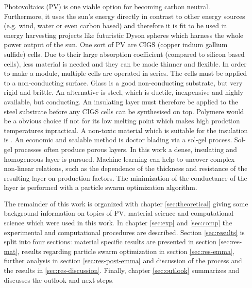Photovoltaics (PV) is one viable option for becoming carbon neutral. 
Furthermore, 
it uses the sun's energy directly in contrast to other energy sources (e.g. wind, water or even carbon based) and therefore 
it is fit to be used in energy harvesting projects like futuristic Dyson spheres\cite{dyson1960search} which harness the whole power output of the sun.
%
One sort of PV are CIGS (copper indium gallium sulfide) cells\cite{Vasekar2010}. 
Due to their large absorption coefficient (compared to silicon based cells), less material is needed and they can be made thinner and flexible. 
In order to make a module, multiple cells are operated in series. 
The cells must be applied to a non-conducting surface.
Glass is a good non-conducting substrate, but very rigid and brittle. 
An alternative is steel, which is ductile, inexpensive and highly available, but conducting. 
An insulating layer must therefore be applied to the steel substrate before any CIGS cells can be synthesised on top.
Polymere would be a obvious choice if not for its low melting point which makes high prodction temperatures inpractical.
A non-toxic material which is suitable for the insulation is . 
An economic and scalable method is doctor blading via a sol-gel process. 
Sol-gel processes often produce porous layers. 
In this work a dense, insulating and homogeneous layer is pursued. 
Machine learning can help to uncover complex non-linear relations, such as the 
dependence of the thickness and resistance of the resulting layer on production factors.
The minimization of the conductance of the layer is performed with a particle swarm optimization 
algorithm. 


The remainder of this work is organized with chapter 
\ref{sec:theoretical} giving 
some background information on topics of PV, material science and computational science which were used in this work.
In chapter \ref{sec:exp} and \ref{sec:comp} the experimental and computational procedures are described. 
Section \ref{sec:results} is split into four sections: material specific results are presented in section \ref{sec:res-mat}, results regarding particle swarm optimization in section \ref{sec:res-emma}, further analysis in section \ref{sec:res-post-emma} and discussion of the process and the results in \ref{sec:res-discussion}.
Finally, chapter \ref{sec:outlook} summarizes and discusses the outlook and next steps.

